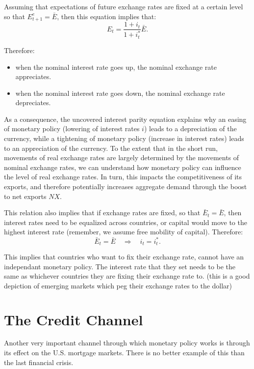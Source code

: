 \documentclass[]{book}
\begin{document}
Assuming that expectations of future exchange rates are fixed at a
certain level so that \(E_{t+1}^e = \bar{E}\), then this equation
implies that: \[\boxed{E_{t}=\frac{{1+i_{t}}}{1+i_{t}^{*}}\bar{E}}.\]

Therefore:

\begin{itemize}
\item
  when the nominal interest rate goes up, the nominal exchange rate
  appreciates.
\item
  when the nominal interest rate goes down, the nominal exchange rate
  depreciates.
\end{itemize}

As a consequence, the uncovered interest parity equation explains why an
easing of monetary policy (lowering of interest rates \(i\)) leads to a
depreciation of the currency, while a tightening of monetary policy
(increase in interest rates) leads to an appreciation of the currency.
To the extent that in the short run, movements of real exchange rates
are largely determined by the movements of nominal exchange rates, we
can understand how monetary policy can influence the level of real
exchange rates. In turn, this impacts the competitiveness of its
exports, and therefore potentially increases aggregate demand through
the boost to net exports \(NX\).

This relation also implies that if exchange rates are fixed, so that
\(\bar{E}_t=\bar{E}\), then interest rates need to be equalized across
countries, or capital would move to the highest interest rate (remember,
we assume free mobility of capital). Therefore:
\[\boxed{\bar{E}_t=\bar{E} \quad \Rightarrow \quad i_t = i_t^{*}}.\]

This implies that countries who want to fix their exchange rate, cannot
have an independant monetary policy. The interest rate that they set
needs to be the same as whichever countries they are fixing their
exchange rate to. (this is a good depiction of emerging markets which
peg their exchange rates to the dollar)

\section{The Credit Channel}\label{the-credit-channel}

Another very important channel through which monetary policy works is
through its effect on the U.S. mortgage markets. There is no better
example of this than the last financial crisis.
\end{document}

